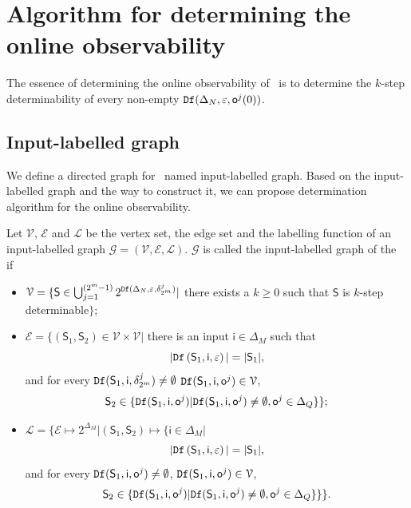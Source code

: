 \section{Algorithm for determining the online observability}
\label{sec:deter}
The essence of determining the online observability of \BCN\ is to determine the $k$-step determinability of every non-empty ${\tt Df}(\Delta_N,\varepsilon, \mathsf{o}^{j}(0))$. 

\subsection{Input-labelled graph}
We define a directed graph for \BCN\ named input-labelled graph. Based on the input-labelled graph and the way to construct it, we can propose determination algorithm for the online observability.

\begin{definition}
Let $\mathcal{V}$, $\mathcal{E}$ and $\mathcal{L}$ be the vertex set, the edge set and the labelling function of an input-labelled graph $\mathcal{G}=(\mathcal{V}, \mathcal{E}, \mathcal{L})$. $\mathcal{G}$ is called the input-labelled graph of the \BCN\, if 
\begin{itemize}
\item  $\mathcal{V}=\{\mathsf{S}\in\bigcup_{j=1}^{(2^m -1)} 2^{{\tt Df}(\Delta_N,\varepsilon,\delta^j_{2^m} )}|$ there exists a $k\ge0$ such that $\mathsf{S}$ is $k$-step determinable$\}$;
\item  $\mathcal{E}=\{(\mathsf{S}_1,\mathsf{S}_2)\in \mathcal{V}\times \mathcal{V}|$ there is an input $\mathsf{i} \in \Delta_M$ such that \[|{\tt Df}\left(\mathsf{S}_1,\mathsf{i},\varepsilon\right)|=|\mathsf{S}_1|,\] and for every ${\tt Df}(\mathsf{S}_1,\mathsf{i},\delta^j_{2^m})\neq \emptyset$ ${\tt Df}(\mathsf{S}_1,\mathsf{i},\mathsf{o}^{j})\in \mathcal{V}$, \[\mathsf{S}_2\in\{{\tt Df}(\mathsf{S}_1,\mathsf{i},\mathsf{o}^{j})| {\tt Df}(\mathsf{S}_1,\mathsf{i},\mathsf{o}^{j})\neq \emptyset, \mathsf{o}^{j}\in \Delta_Q\}\};\]
\item  $\mathcal{L}=\{\mathcal{E}\mapsto 2^{\Delta_M}|(\mathsf{S}_1,\mathsf{S}_2)\mapsto\{\mathsf{i}\in \Delta_M|$\[|{\tt Df}\left(\mathsf{S}_1,\mathsf{i},\varepsilon\right)|=|\mathsf{S}_1|,\] and for every ${\tt Df}(\mathsf{S}_1,\mathsf{i},\mathsf{o}^{j})\neq \emptyset$, ${\tt Df}(\mathsf{S}_1,\mathsf{i},\mathsf{o}^{j})\in \mathcal{V}$, \[\mathsf{S}_2\in\{{\tt Df}(\mathsf{S}_1,\mathsf{i},\mathsf{o}^{j})| {\tt Df}(\mathsf{S}_1,\mathsf{i},\mathsf{o}^{j})\neq \emptyset, \mathsf{o}^{j}\in \Delta_Q\}\}\}.\]
 \end{itemize}
\end{definition}

